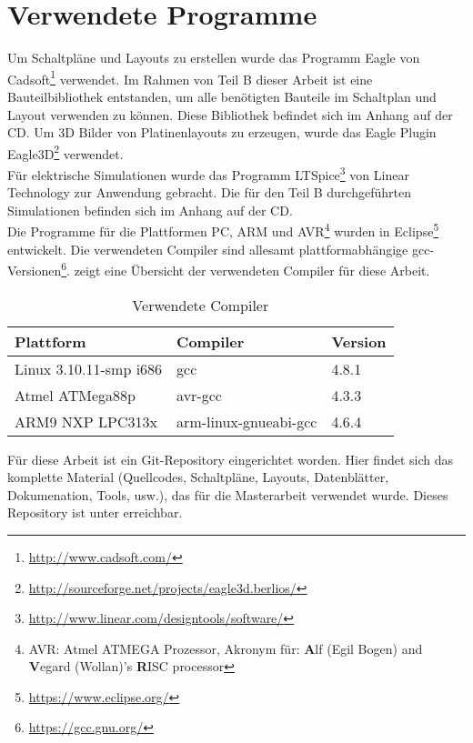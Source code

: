 \section{Verwendete Programme}
Um Schaltpläne und Layouts zu erstellen wurde das Programm Eagle von Cadsoft\footnote{\url{http://www.cadsoft.com/}} verwendet. Im Rahmen von Teil B dieser Arbeit ist eine Bauteilbibliothek entstanden, um alle benötigten Bauteile im Schaltplan und Layout verwenden zu können. Diese Bibliothek befindet sich im Anhang auf der CD.
Um 3D Bilder von Platinenlayouts zu erzeugen, wurde das Eagle Plugin Eagle3D\footnote{\url{http://sourceforge.net/projects/eagle3d.berlios/}} verwendet.\\
Für elektrische Simulationen wurde das Programm LTSpice\footnote{\url{http://www.linear.com/designtools/software/}} von Linear Technology zur Anwendung gebracht. Die für den Teil B durchgeführten Simulationen befinden sich im Anhang auf der CD.\\
Die Programme für die Plattformen PC, ARM und AVR\footnote{AVR: Atmel ATMEGA Prozessor, Akronym für: \textbf{A}lf (Egil Bogen) and \textbf{V}egard (Wollan)'s \textbf{R}ISC processor} wurden in Eclipse\footnote{\url{https://www.eclipse.org/}} entwickelt. Die verwendeten Compiler sind allesamt plattformabhängige gcc-Versionen\footnote{\url{https://gcc.gnu.org/}}.  zeigt eine Übersicht der verwendeten Compiler für diese Arbeit.

\begin{table}[h]
\begin{tabular}{|p{4.5cm}|p{4cm}|p{4cm}|}\hline
\rowcolor{TableBackgroundColor} 
\textbf{Plattform}		&	\textbf{Compiler}		&	\textbf{Version}  \\ \hline
 Linux 3.10.11-smp i686	&	gcc						& 4.8.1	\\ \hline
 Atmel ATMega88p		&	avr-gcc					& 4.3.3	\\ \hline
 ARM9 NXP LPC313x		&	arm-linux-gnueabi-gcc	& 4.6.4	\\ \hline
\end{tabular}
\caption{Verwendete Compiler}
\label{tab:verwendete_compiler}
\end{table}

Für diese Arbeit ist ein Git-Repository eingerichtet worden. Hier findet sich das komplette Material (Quellcodes, Schaltpläne, Layouts, Datenblätter, Dokumenation, Tools, usw.), das für die Masterarbeit verwendet wurde. Dieses Repository ist unter  erreichbar.